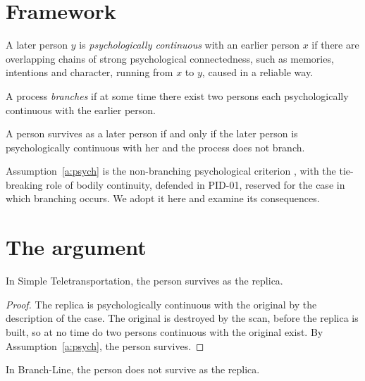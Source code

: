 \documentclass{situationist-preprint}
\begin{document}
\section{Framework}

\begin{definition}\label{d:cont}
A later person $y$ is \emph{psychologically continuous} with an earlier person $x$ if there are overlapping chains of strong psychological connectedness, such as memories, intentions and character, running from $x$ to $y$, caused in a reliable way.
\end{definition}

\begin{definition}\label{d:branch}
A process \emph{branches} if at some time there exist two persons each psychologically continuous with the earlier person.
\end{definition}

\begin{assumption}\label{a:psych}
A person survives as a later person if and only if the later person is psychologically continuous with her and the process does not branch.
\end{assumption}

Assumption~\ref{a:psych} is the non-branching psychological criterion \citep{Shoemaker1984,Parfit1984}, with the tie-breaking role of bodily continuity, defended in PID-01, reserved for the case in which branching occurs. We adopt it here and examine its consequences.

\section{The argument}

\begin{proposition}\label{p:simple}
In Simple Teletransportation, the person survives as the replica.
\end{proposition}

\begin{proof}
The replica is psychologically continuous with the original by the description of the case. The original is destroyed by the scan, before the replica is built, so at no time do two persons continuous with the original exist. By Assumption~\ref{a:psych}, the person survives.
\end{proof}

\begin{proposition}\label{p:branch}
In Branch-Line, the person does not survive as the replica.
\end{proposition}
\end{document}
